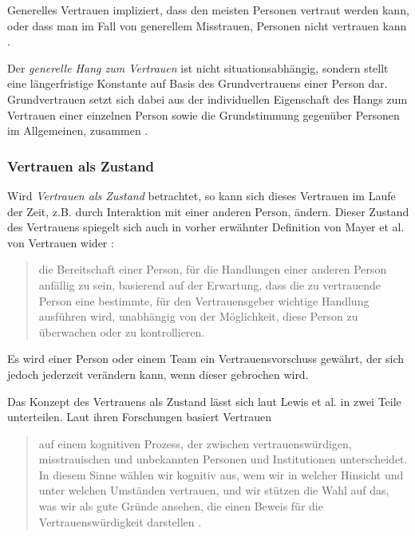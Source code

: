 \documentclass[a4paper,11pt]{article}%
\renewcommand{\\}{\vspace*{0.5\baselineskip} \newline}
\begin{document}
Generelles Vertrauen impliziert, dass den meisten Personen vertraut werden kann, oder dass man im Fall von generellem Misstrauen, Personen nicht vertrauen kann \citep[S.409]{stolle2002trusting}.

Der \textit{generelle Hang zum Vertrauen} ist nicht situationsabhängig, sondern stellt eine längerfristige Konstante auf Basis des Grundvertrauens einer Person dar. Grundvertrauen setzt sich dabei aus der individuellen Eigenschaft des Hangs zum Vertrauen einer einzelnen Person sowie die Grundstimmung gegenüber Personen im Allgemeinen, zusammen \citep[S.11]{couch1996assessment}.

	\subsubsection{Vertrauen als Zustand}
\label{Vertrauen als Zustand}
Wird \textit{Vertrauen als Zustand} betrachtet, so kann sich dieses Vertrauen im Laufe der Zeit, z.B. durch Interaktion mit einer anderen Person, ändern. Dieser Zustand des Vertrauens spiegelt sich auch in vorher erwähnter Definition von Mayer et al. von Vertrauen wider \citep[S.712]{mayer1995integrative} :
\begin{quote}
\glqq{}die Bereitschaft einer Person, für die Handlungen einer anderen Person anfällig zu sein, basierend auf der Erwartung, dass die zu vertrauende Person eine bestimmte, für den Vertrauensgeber wichtige Handlung ausführen wird, unabhängig von der Möglichkeit, diese Person zu überwachen oder zu kontrollieren.\dq{}
\end{quote}
Es wird einer Person oder einem Team ein Vertrauensvorschuss gewährt, der sich jedoch jederzeit verändern kann, wenn dieser gebrochen wird.

Das Konzept des Vertrauens als Zustand lässt sich laut Lewis et al. \citep[S.970-971]{lewis1985trust} in zwei Teile unterteilen.\newline
Laut ihren Forschungen basiert Vertrauen 

\begin{quote}
\glqq{}auf einem kognitiven Prozess, der zwischen vertrauenswürdigen, misstrauischen und unbekannten Personen und Institutionen unterscheidet. In diesem Sinne wählen wir kognitiv aus, wem wir in welcher Hinsicht und unter welchen Umständen vertrauen, und wir stützen die Wahl auf das, was wir als \dq{}gute Gründe\glqq{} ansehen, die einen Beweis für die Vertrauenswürdigkeit darstellen\dq{} \citep[S.970]{lewis1985trust}.
\end{quote}
\end{document}
